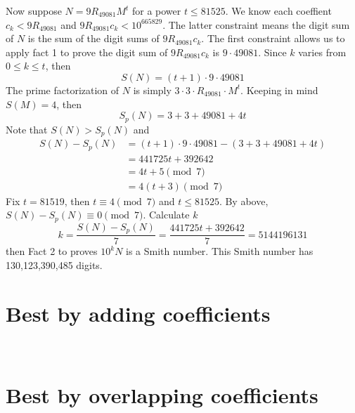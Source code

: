 \documentclass{amsart}
\newcommand{\RE}{{49081}}
\newcommand{\ME}{{665829}}
\numberwithin{equation}{section}
\theoremstyle{plain} %
\theoremstyle{definition}
\theoremstyle{remark}
\begin{document}
Now suppose $N = 9 R_{49081} M^t$ for a power $t\leq 81525$. We know each coeffient $c_k < 9R_{\RE}$ and $9 R_{\RE} c_k < 10^\ME$. The latter constraint means the digit sum of $N$ is the sum of the digit sums of $9 R_{49081} c_k$. The first constraint allows us to apply fact 1 to prove the digit sum of $ 9 R_{49081} c_k$ is $9 \cdot 49081$. Since $k$ varies from $0 \leq k \leq t$, then
$$S(N) = (t+1) \cdot 9 \cdot 49081$$
The prime factorization of $N$ is simply $3\cdot 3 \cdot R_\RE \cdot M^t$. Keeping in mind $S(M) = 4$, then
$$S_p(N) = 3 + 3 + \RE + 4t$$
Note that $S(N) > S_p(N)$ and 
\begin{align*}
S(N) - S_p(N) &= (t+1) \cdot 9 \cdot \RE - (3 + 3 + \RE + 4t) \\
&= 441725 t + 392642 \\
&= 4t +5 \pmod{7}\\
&= 4(t +3) \pmod{7}
\end{align*}
Fix $t=81519$, then $t \equiv 4 \pmod{7}$ and $t \leq 81525$. By above, $S(N) - S_p(N) \equiv 0 \pmod{7}$. Calculate $k$
$$k = \frac{ S(N) - S_p(N)}{7} = \frac{441725 t + 392642}{7} = 5144196131$$
then Fact 2 to proves $10^k N$ is a Smith number. This Smith number has 130,123,390,485 digits.
\\ 
 \section{Best by adding coefficients}
\,\\ \section{Best by overlapping coefficients}


 
\end{document}
